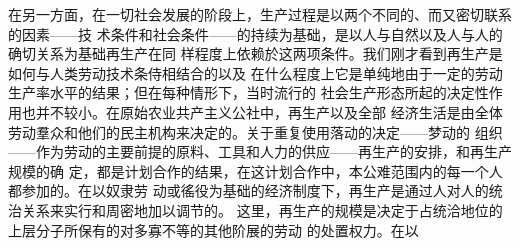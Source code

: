在另一方面，在一切社会发展的阶段上，生产过程是以两个不同的、而又密切联系的因素——技
术条件和社会条件——的持续为基础，是以人与自然以及人与人的确切关系为基础再生产在同
样程度上依赖於这两项条件。我们刚才看到再生产是如何与人类劳动技术条侍相结合的以及
在什么程度上它是单纯地由于一定的劳动生产率水平的结果；但在每种情形下，当时流行的
社会生产形态所起的决定性作用也并不较小。在原始农业共产主义公社中，再生产以及全部
经济生活是由全体劳动羣众和他们的民主机构来决定的。关于重复使用落动的决定——梦动的
组织——作为劳动的主要前提的原料、工具和人力的供应——再生产的安排，和再生产规模的确
定，都是计划合作的结果，在这计划合作中，本公难范围内的每一个人都参加的。在以奴隶劳
动或徭役为基础的经济制度下，再生产是通过人对人的统治关系来实行和周密地加以调节的。
这里，再生产的规模是决定于占统洽地位的上层分子所保有的对多寡不等的其他阶展的劳动
的处置权力。在以


